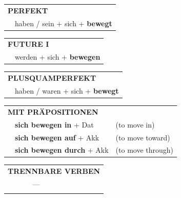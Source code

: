 \documentclass[10pt,a4paper]{revtex4-2}
\begin{document}
\begin{verbbox}
 \begin{tabular}{rl}
     \multicolumn{2}{l}{\textbf{PERFEKT}}\\
   & haben / sein + sich + \textbf{bewegt}
  \end{tabular}
\hfill
   \begin{tabular}{rl}
    \multicolumn{2}{l}{\textbf{FUTURE I}}\\
   & werden + sich + \textbf{bewegen}\\
  \end{tabular}
\hfill
   \begin{tabular}{rl}
      \multicolumn{2}{l}{\textbf{PLUSQUAMPERFEKT}}\\
   & haben / waren + sich + \textbf{bewegt}\\
  \end{tabular}

   \vspace{10pt}

   \begin{tabular}{lll}
      \multicolumn{3}{l}{\textbf{MIT PRÄPOSITIONEN}}\\
& \textbf{sich bewegen in} + Dat & (to move in)\\
& \textbf{sich bewegen auf} + Akk & (to move toward)\\
& \textbf{sich bewegen durch} + Akk & (to move through)\\
\end{tabular}
  \hfill
\begin{tabular}{lll}
\multicolumn{3}{l}{\textbf{TRENNBARE VERBEN}}\\
& ---\\
\vspace{20pt}
\end{tabular}

  \vspace{-5pt}
\end{verbbox}
\end{document}
